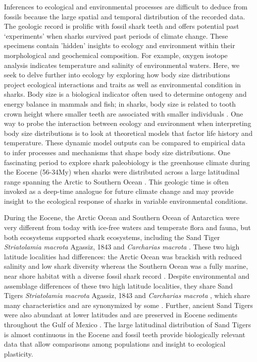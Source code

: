 \documentclass[]{rsos}%
\begin{document}
Inferences to ecological and environmental processes are difficult to deduce from fossils because the large spatial and temporal distribution of the recorded data. 
The geologic record is prolific with fossil shark teeth and offers potential past ‘experiments’ when sharks survived past periods of climate change. 
These specimens contain 'hidden' insights to ecology and environment within their morphological and geochemical composition. 
For example, oxygen isotope analysis indicates temperature and salinity of environmental waters.
Here, we seek to delve further into ecology by exploring how body size distributions project ecological interactions and traits as well as environmental condition in sharks.
Body size is a biological indicator often used to determine ontogeny and energy balance in mammals and fish; in sharks, body size is related to tooth crown height where smaller teeth are associated with smaller individuals \cite{Shimada2002, Shimada2004, Shimada2007, Shimada2020, Villafana2020}.
One way to probe the interaction between ecology and environment when interpreting  body size distributions is to look at theoretical models that factor life history and temperature.
These dynamic model outputs can be compared to empirical data to infer processes and mechanisms that shape body size distributions.
One fascinating period to explore shark paleobiology is the greenhouse climate during the Eocene (56-34My) when sharks were distributed across a large latitudinal range spanning the Arctic \cite{Eberle2012, fieman2016comparing} to Southern Ocean \cite{Long1992, Kriwet2016}.
This geologic time is often invoked as a deep-time analogue for future climate change and may provide insight to the ecological response of sharks in variable environmental conditions.  

During the Eocene, the Arctic Ocean and Southern Ocean of Antarctica were very different from today with ice-free waters and temperate flora and fauna, but both ecosystems supported shark ecosystems, including the Sand Tiger \emph{Striatolamia macrota} Agassiz, 1843 and \emph{Carcharias macrota} \cite{Kriwet2005, Reguero2012, Padilla2014, Kriwet2016, Engelbrecht2019}.
These two high latitude localities had differences: the Arctic Ocean was brackish with reduced salinity \cite{Waddell2010,Kim2014} and low shark diversity \cite{Greenwood2010,Padilla2014} whereas the Southern Ocean was a fully marine, near shore habitat \cite{Ivany2008} with a diverse fossil shark record \cite{Long1992,Kriwet2016}.
Despite environmental and assemblage differences of these two high latitude localities, they share Sand Tigers \emph{Striatolamia macrota} Agassiz, 1843 and \emph{Carcharias macrota} \cite{Kriwet2005, Reguero2012, Padilla2014, Kriwet2016, Engelbrecht2019}, which share many characteristics and are synonymized by some \cite{purdy1998chondrichthyan}.
Further, ancient Sand Tigers were also abundant at lower latitudes and are preserved in Eocene sediments throughout the Gulf of Mexico \cite{Westgate}.
The large latitudinal distribution of Sand Tigers is almost continuous in the Eocene and fossil teeth provide biologically relevant data that allow comparisons among populations and insight to ecological plasticity.
\end{document}
